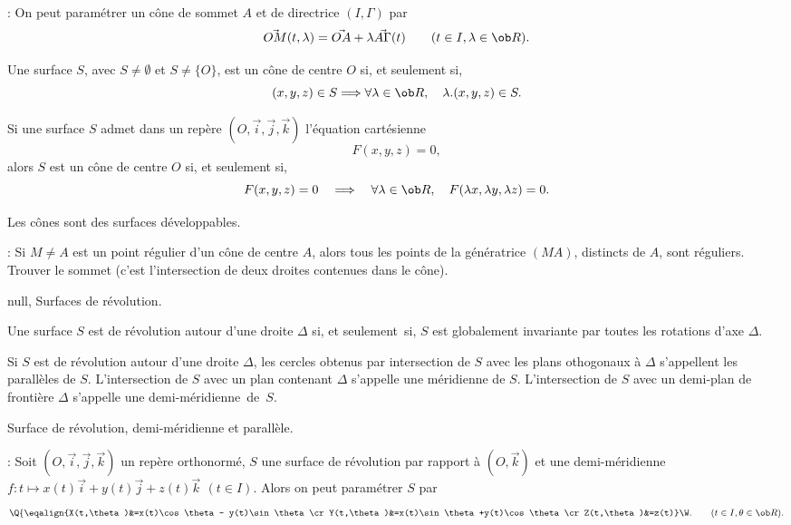 \Remarque : On peut param\'etrer un c\^one de sommet $A$ et de directrice $(I,\Gamma)$ par 
$$
\vec{OM}(t,\lambda)=\vec{OA}+\lambda\vec{A\Gamma}(t)\qquad(t\in I,\lambda\in\ob R).
$$

Une surface $S$, avec $S\neq\emptyset$ et $S\neq\{O\}$, est un c\^one de centre $O$ si, et seulement si, 
$$
(x,y,z)\in S\Longrightarrow \forall\lambda\in\ob R,\quad \lambda.(x,y,z)\in S.
$$

\Propriete [] Si une surface $S$ admet dans un rep\`ere $(O,\vec i,\vec j,\vec k)$ 
l'\'equation cart\'esienne  
$$
F(x,y,z)=0,
$$
alors $S$ est un c\^one de centre $O$ si, et seulement si, 
$$
F(x,y,z)=0\quad\Longrightarrow\quad \forall\lambda\in\ob R,\quad F(\lambda x,\lambda y,\lambda z)=0. 
$$

\Propriete 
Les c\^ones sont des surfaces d\'eveloppables. 

\Remarque : Si $M\neq A$ est un point r\'egulier d'un c\^one de centre $A$, alors 
tous les points de la g\'en\'eratrice $(MA)$, distincts de $A$, sont r\'eguliers. 
\bigskip
{}Trouver le sommet (c'est l'intersection de deux droites contenues dans le c\^one). 
\bigskip

\Subsection null, Surfaces de r\'evolution.

\Definition [] Une surface $S$ est de r\'evolution autour d'une droite $\Delta$ si, 
et seulement~si, 
$S$ est globalement invariante par toutes les rotations d'axe $\Delta$. 


\Definition [] Si $S$ est de r\'evolution autour d'une droite $\Delta$, 
les cercles obtenus par intersection de $S$ avec les plans othogonaux \`a $\Delta$ s'appellent les parall\`eles de $S$. 
\pn
L'intersection de $S$ avec un plan contenant $\Delta$ s'appelle une m\'eridienne de $S$. \pn
L'intersection de $S$ avec un demi-plan de fronti\`ere $\Delta$ s'appelle 
une demi-m\'eridienne~de~$S$.

\centerline{%
}%
\Figure [Index=Surfaces!de revolution@de r\'evolution]  Surface de r\'evolution, demi-m\'eridienne et parall\`ele.
\bigskip

\Remarque : Soit $(O,\vec i,\vec j,\vec k)$ un rep\`ere orthonorm\'e, 
$S$ une surface de r\'evolution par rapport \`a $(O,\vec k)$ 
et une demi-m\'eridienne $f:t\mapsto x(t)\vec i+y(t)\vec j+z(t)\vec k\ \,(t\in I)$. 
Alors on peut param\'etrer $S$ par 
$$\Q\{\eqalign{X(t,\theta)&=x(t)\cos\theta- y(t)\sin\theta\cr
Y(t,\theta)&=x(t)\sin\theta+y(t)\cos\theta \cr
Z(t,\theta)&=z(t)}\W.\qquad(t\in I,\theta\in\ob R).
$$


